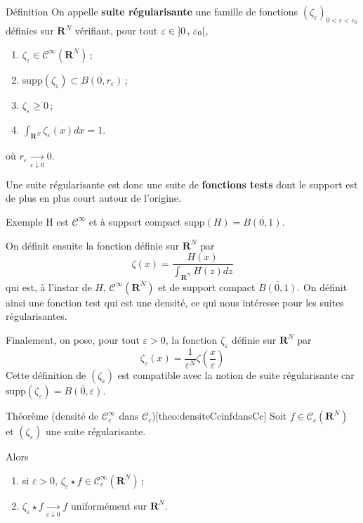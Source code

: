         \begin{omed}{Définition}
            On appelle \textbf{suite régularisante} une famille de fonctions $(\zeta_{\varepsilon})_{0 < \varepsilon < \varepsilon_0}$ définies sur $\mathbf{R}^N$ vérifiant, pour tout $\varepsilon \in \left] 0 \, , \, \varepsilon_0 \right[$, 
            \begin{enumerate}[label=($h_{\arabic*}$)]
                \item $\zeta_{\varepsilon} \in \mathcal{C}^{\infty}(\mathbf{R}^N)$ ;
                \item $\text{supp}(\zeta_{\varepsilon}) \subset \overline{B(0,r_{\varepsilon})}$ ;
                \item $\zeta_{\varepsilon} \geq 0$ ;
                \item $\int_{\mathbf{R}^N} \zeta_{\varepsilon}(x)dx = 1$.
            \end{enumerate}
            où $r_{\varepsilon} \underset{\varepsilon \downarrow 0}{\longrightarrow} 0$. 
        \end{omed}

        Une suite régularisante est donc une suite de \textbf{fonctions tests} dont le support est de plus en plus court autour de l’origine. 

        \begin{demo}{Exemple}
        H est $\mathcal{C}^{\infty}$ et à support compact $\text{supp}(H) = \overline{B(0,1)}$.

        On définit ensuite la fonction définie sur $\mathbf{R}^N$ par 
        \[ \zeta(x) = \frac{H(x)}{\int_{\mathbf{R}^N} H(z)dz} \]   
        qui est, à l’instar de $H$, $\mathcal{C}^{\infty}(\mathbf{R}^N)$ et de support compact $\overline{B(0,1)}$. On définit ainsi une fonction test qui est une densité, ce qui nous intéresse pour les suites régularisantes. 

        Finalement, on pose, pour tout $\varepsilon > 0$, la fonction $\zeta_{\varepsilon}$ définie sur $\mathbf{R}^N$ par 
        \[ \zeta_{\varepsilon}(x) = \frac{1}{\varepsilon^N} \zeta\left(\frac{x}{\varepsilon}\right) \] 
        Cette définition de $(\zeta_{\varepsilon})$ est compatible avec la notion de suite régularisante car $\text{supp}(\zeta_{\varepsilon}) = \overline{B(0,\varepsilon)}$. 
        \end{demo}

        \begin{omed}{Théorème (densité de $\mathcal{C}_c^{\infty}$ dans $\mathcal{C}_c$)}[theo:densiteCcinfdansCc]
            Soit $f \in \mathcal{C}_c(\mathbf{R}^N)$ et $(\zeta_{\varepsilon})$ une suite régularisante. 

            Alors 
            \begin{enumerate}[label=($p_{\arabic*}$)]
                \item si $\varepsilon > 0$, $\zeta_{\varepsilon} \star f \in \mathcal{C}_c^{\infty}(\mathbf{R}^N)$ ;
                \item $\zeta_{\varepsilon} \star f \underset{\varepsilon \downarrow 0}{\longrightarrow} f$ uniformément sur $\mathbf{R}^N$.
            \end{enumerate}
        \end{omed}

